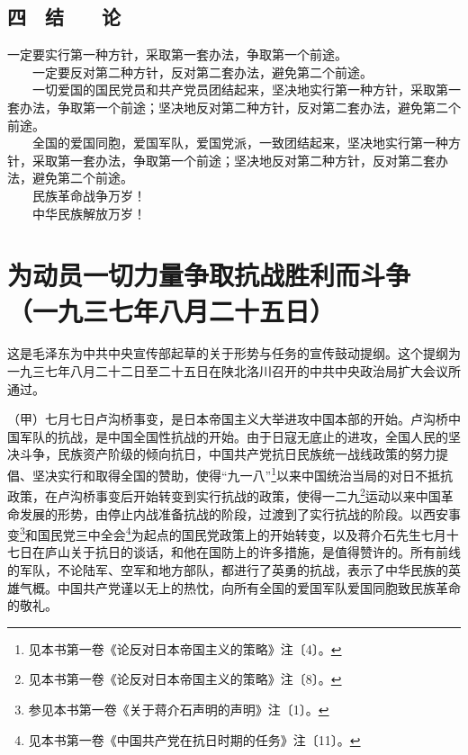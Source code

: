\documentclass[cn,11pt,chinese]{elegantbook}
\def\myformat#1{\hfil\hfil #1}
\begin{document}
\subsection*{\myformat{四　结　　论}}
一定要实行第一种方针，采取第一套办法，争取第一个前途。\\
　　一定要反对第二种方针，反对第二套办法，避免第二个前途。\\
　　一切爱国的国民党员和共产党员团结起来，坚决地实行第一种方针，采取第一套办法，争取第一个前途；坚决地反对第二种方针，反对第二套办法，避免第二个前途。\\
　　全国的爱国同胞，爱国军队，爱国党派，一致团结起来，坚决地实行第一种方针，采取第一套办法，争取第一个前途；坚决地反对第二种方针，反对第二套办法，避免第二个前途。\\
　　民族革命战争万岁！\\
　　中华民族解放万岁！\\
\newpage\section*{\myformat{为动员一切力量争取抗战胜利而斗争}\\\myformat{（一九三七年八月二十五日）}}
\begin{introduction}\item  这是毛泽东为中共中央宣传部起草的关于形势与任务的宣传鼓动提纲。这个提纲为一九三七年八月二十二日至二十五日在陕北洛川召开的中共中央政治局扩大会议所通过。\end{introduction}
（甲）七月七日卢沟桥事变，是日本帝国主义大举进攻中国本部的开始。卢沟桥中国军队的抗战，是中国全国性抗战的开始。由于日寇无底止的进攻，全国人民的坚决斗争，民族资产阶级的倾向抗日，中国共产党抗日民族统一战线政策的努力提倡、坚决实行和取得全国的赞助，使得“九一八”\footnote[1]{ 见本书第一卷《论反对日本帝国主义的策略》注〔4〕。}以来中国统治当局的对日不抵抗政策，在卢沟桥事变后开始转变到实行抗战的政策，使得一二九\footnote[2]{ 见本书第一卷《论反对日本帝国主义的策略》注〔8〕。}运动以来中国革命发展的形势，由停止内战准备抗战的阶段，过渡到了实行抗战的阶段。以西安事变\footnote[3]{ 参见本书第一卷《关于蒋介石声明的声明》注〔1〕。}和国民党三中全会\footnote[4]{ 见本书第一卷《中国共产党在抗日时期的任务》注〔11〕。}为起点的国民党政策上的开始转变，以及蒋介石先生七月十七日在庐山关于抗日的谈话，和他在国防上的许多措施，是值得赞许的。所有前线的军队，不论陆军、空军和地方部队，都进行了英勇的抗战，表示了中华民族的英雄气概。中国共产党谨以无上的热忱，向所有全国的爱国军队爱国同胞致民族革命的敬礼。\\
\end{document}
